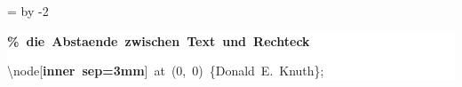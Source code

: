 \begingroup
\ttfamily
{}
=\textwidth
\advance{} by -2\fboxsep
\noindent
\colorbox{background}
{%
\parbox{\dimen255}
{%
\rule[-0.5ex]{0pt}{2.5ex}\hspace*{0.0em}\textcolor{G}{\textbf{\%~die~Abstaende~zwischen~Text~und~Rechteck}}\\
\rule[-0.5ex]{0pt}{2.5ex}\hspace*{0.0em}\textbackslash{}node[\textcolor{R}{\textbf{inner~sep=3mm}}]~at~(0,~0)~\{Donald~E.~Knuth\};}%
}%
\endgroup
